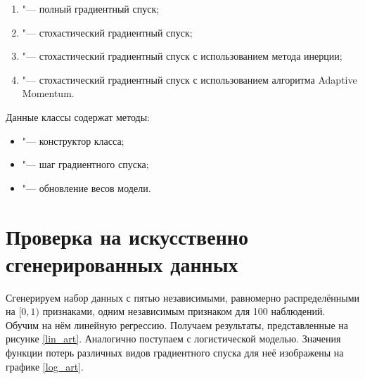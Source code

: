 \documentclass{article}
\begin{document}
\begin{enumerate}
\begin{enumerate}
        \item {} "--- полный градиентный спуск;
        \item {} "--- стохастический градиентный спуск;
        \item {} "--- стохастический градиентный спуск с использованием метода инерции;
        \item {} "--- стохастический градиентный спуск с использованием алгоритма Adaptive Momentum.
    \end{enumerate}
    Данные классы содержат методы: 
    \begin{itemize}
        \item {} "--- конструктор класса;
        \item {} "--- шаг градиентного спуска;
        \item {} "--- обновление весов модели. 
   \end{itemize}
\end{enumerate}

\section*{Проверка на искусственно сгенерированных данных}
Сгенерируем набор данных с пятью независимыми, равномерно распределёнными на $[0,1)$ признаками, одним независимым признаком для 100 наблюдений. Обучим на нём линейную регрессию. Получаем результаты, представленные на рисунке \ref{lin_art}. Аналогично поступаем с логистической моделью. Значения функции потерь различных видов градиентного спуска для неё изображены на графике \ref{log_art}.
\end{document}
